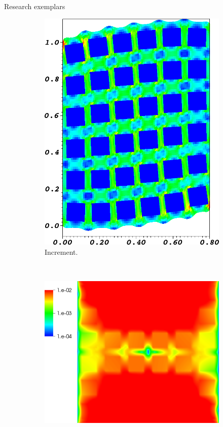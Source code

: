 \documentclass{beamer}
\begin{document}
\begin{frame}{Research exemplars}
\begin{figure}
  \begin{subfigure}[b]{0.18\textwidth}
    \includegraphics[width=\textwidth]{figures/MG/ElasticityCompressShearTrim}
    \caption{Increment.}\label{fig:elast-increment}
  \end{subfigure} ~
  \begin{subfigure}[b]{0.28\textwidth}
    \includegraphics[width=\textwidth]{figures/MG/ElasticityCompressErrorNoTauTrim}

\end{subfigure}
\end{figure}
\end{frame}
\end{document}
